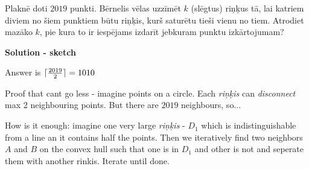 \begin{problem}
Plaknē doti $2019$ punkti. Bērnelis vēlas uzzīmēt $k$ (slēgtus) riņķus tā, lai katriem diviem no šiem \mbox{punktiem} būtu riņķis, kurš saturētu tieši vienu no tiem.
Atrodiet mazāko $k$, pie kura to ir iespējams izdarīt jebkuram punktu izkārtojumam?

\textbf{Solution - sketch}

Answer is $\lceil\frac{2019}{2}\rceil=1010$

Proof that cant go less - imagine points on a circle. Each \emph{riņķis} can \emph{disconnect} max 2 neighbouring points. But there are $2019$ neighbours, so...

How is it enough:
imagine one very large \emph{riņķis} - $D_1$ which is indistinguishable from a line an it contains half the points. 
Then we iteratively find two neighbors $A$ and $B$ on the convex hull such that one is in $D_1$ and other is not and seperate them with another rinkis. Iterate until done.
\end{problem}

%

